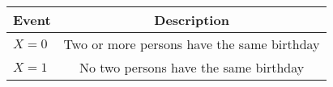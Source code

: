 \begin{tabular}{|l|c|}
	\hline
	\textbf{Event} & \textbf{Description} \\
	\hline
	$X = 0$ &  Two or more persons have the same birthday\\
	\hline
	$X = 1$ &  No two persons have the same birthday \\
	\hline

\end{tabular}
